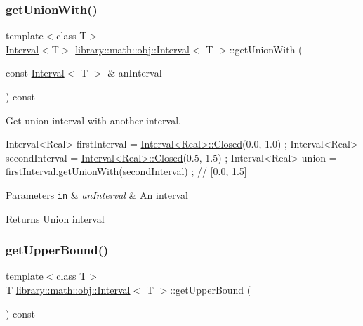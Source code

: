 \subsubsection{\texorpdfstring{get\+Union\+With()}{getUnionWith()}}
{\footnotesize\ttfamily template$<$class T$>$ \\
\hyperlink{classlibrary_1_1math_1_1obj_1_1_interval}{Interval}$<$T$>$ \hyperlink{classlibrary_1_1math_1_1obj_1_1_interval}{library\+::math\+::obj\+::\+Interval}$<$ T $>$\+::get\+Union\+With (\begin{DoxyParamCaption}\item[{const \hyperlink{classlibrary_1_1math_1_1obj_1_1_interval}{Interval}$<$ T $>$ \&}]{an\+Interval }\end{DoxyParamCaption}) const}



Get union interval with another interval. 


\begin{DoxyCode}
Interval<Real> firstInterval = \hyperlink{classlibrary_1_1math_1_1obj_1_1_interval_aae8bb2b89af450729338d48563def4d7}{Interval<Real>::Closed}(0.0, 1.0) ;
Interval<Real> secondInterval = \hyperlink{classlibrary_1_1math_1_1obj_1_1_interval_aae8bb2b89af450729338d48563def4d7}{Interval<Real>::Closed}(0.5, 1.5) ;
Interval<Real> \textcolor{keyword}{union }= firstInterval.\hyperlink{classlibrary_1_1math_1_1obj_1_1_interval_a4183db388b6a63429a031d3687b20ecf}{getUnionWith}(secondInterval) ; \textcolor{comment}{// [0.0, 1.5]}
\end{DoxyCode}



\begin{DoxyParams}[1]{Parameters}
\mbox{\tt in}  & {\em an\+Interval} & An interval \\
\hline
\end{DoxyParams}
\begin{DoxyReturn}{Returns}
Union interval 
\end{DoxyReturn}
\mbox{\label{classlibrary_1_1math_1_1obj_1_1_interval_a97d09e9c5e7f67b6ddf162af01a8066e}} 
\subsubsection{\texorpdfstring{get\+Upper\+Bound()}{getUpperBound()}}
{\footnotesize\ttfamily template$<$class T$>$ \\
T \hyperlink{classlibrary_1_1math_1_1obj_1_1_interval}{library\+::math\+::obj\+::\+Interval}$<$ T $>$\+::get\+Upper\+Bound (\begin{DoxyParamCaption}{ }\end{DoxyParamCaption}) const}



